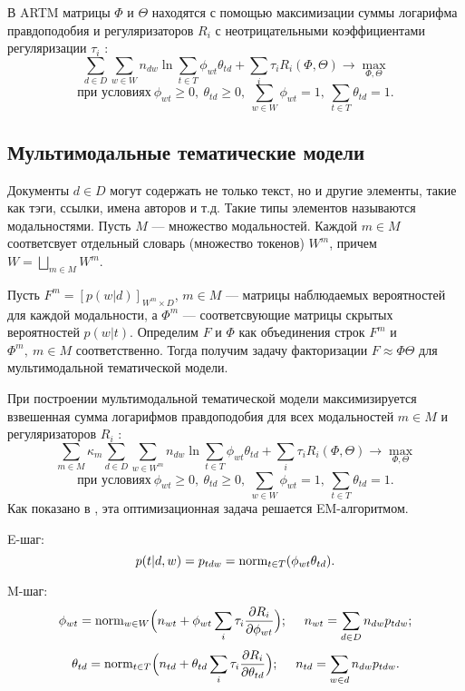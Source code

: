 В ARTM матрицы $\Phi$ и $\Theta$ находятся с помощью максимизации  суммы логарифма правдоподобия и регуляризаторов $R_i$ с неотрицательными коэффициентами регуляризации
$\tau_i$ \cite{ARTM4}: 
$$ \sum\limits_{d \in D} \sum\limits_{w \in W} n_{dw} \ln{\sum\limits_{t \in T} \phi_{wt}\theta_{td}} + \sum_{i} \tau_i R_i(\Phi, \Theta) \rightarrow 
\max\limits_{\Phi, \Theta}$$ 
$$ \text{при условиях}  \ \phi_{wt} \geq 0, \ \theta_{td} \geq 0,\ \sum\limits_{w \in W} \phi_{wt} = 1, \ \sum\limits_{t \in T} \theta_{td} = 1.$$

\subsection{Мультимодальные тематические модели}
Документы $d \in D$ могут содержать не только текст, но и другие элементы, такие как тэги, ссылки, имена авторов и т.д. Такие типы элементов называются модальностями. Пусть $M$ --- множество модальностей. Каждой $m \in M$ соответсвует отдельный словарь (множество токенов)  $W^m$, причем $W = \bigsqcup\limits_{m \in M} W^m $.

Пусть $F^m=[p(w|d)]_{W^m \times D}$, $m \in M$ --- матрицы наблюдаемых вероятностей для каждой модальности, а $\Phi^m$ --- соответсвующие матрицы скрытых вероятностей $p(w|t)$. Определим $F$ и $\Phi$ как объединения строк $F^m$ и $\Phi^m, \ m \in M$ соответственно. Тогда получим задачу факторизации $F \approx \Phi \Theta$ для мультимодальной тематической модели.

При построении мультимодальной тематической модели максимизируется взвешенная сумма логарифмов правдоподобия для всех модальностей $m \in M$ и регуляризаторов $R_i$ \cite{ARTM4}: 
$$ \sum\limits_{m \in M} \kappa_m \sum\limits_{d \in D} \sum\limits_{w \in W^m} n_{dw} \ln{\sum\limits_{t \in T} \phi_{wt}\theta_{td}} + \sum_{i} \tau_i R_i(\Phi, \Theta) \rightarrow 
\max\limits_{\Phi, \Theta}$$
$$ \text{при условиях}  \ \phi_{wt} \geq 0, \ \theta_{td} \geq 0,\ \sum\limits_{w \in W} \phi_{wt} = 1, \ \sum\limits_{t \in T} \theta_{td} = 1.$$
Как показано в \cite{ARTM1}, эта оптимизационная задача решается EM-алгоритмом.

E-шаг: $$p(t|d, w) = p_{tdw} =\text{norm}_{t\in T}(\phi_{wt}\theta_{td}).$$

M-шаг: $$\phi_{wt} = \text{norm}_{w \in W}\Bigl(n_{wt}+\phi_{wt}\sum\limits_{i}\tau_i\dfrac{\partial  R_i}{\partial \phi_{wt}}\Bigr); \ \  \ \ n_{wt} = \sum\limits_{d \in D} n_{dw} p_{tdw};$$
	$$ \theta_{td} = \text{norm}_{t \in T}\Bigl(n_{td}+\theta_{td}\sum\limits_{i}\tau_i\dfrac{\partial R_i}{\partial \theta_{td}}\Bigr); \ \  \ \ n_{td} = \sum\limits_{w \in d} n_{dw} p_{tdw}.$$


